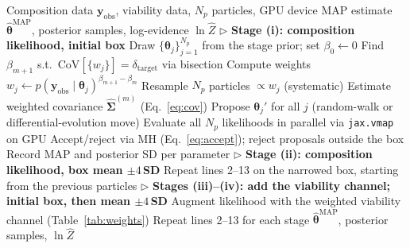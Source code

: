 \documentclass[11pt,a4paper]{article}
\newcommand{\btheta}{\boldsymbol{\theta}}
\newcommand{\yobs}{\mathbf{y}_{\mathrm{obs}}}
\begin{document}
\begin{algorithm}[t]
\caption{Staged GPU-accelerated TMCMC (one seed; every stage is run with three seeds and checked as in Section~\ref{sec:convergence})}
\label{alg:tmcmc}
\begin{algorithmic}[1]
\REQUIRE Composition data $\yobs$, viability data, $N_p$ particles, GPU device
\ENSURE MAP estimate $\hat{\btheta}^{\mathrm{MAP}}$, posterior samples, log-evidence $\ln\hat{Z}$
\STATE $\triangleright$ \textbf{Stage (i): composition likelihood, initial box}
\STATE Draw $\{\btheta_j\}_{j=1}^{N_p}$ from the stage prior; set $\beta_0\leftarrow 0$
    \STATE Find $\beta_{m+1}$ s.t.\ $\mathrm{CoV}[\{w_j\}]=\delta_{\mathrm{target}}$ via bisection
    \STATE Compute weights $w_j \leftarrow p(\yobs\mid\btheta_j)^{\beta_{m+1}-\beta_m}$
    \STATE Resample $N_p$ particles $\propto w_j$ (systematic)
    \STATE Estimate weighted covariance $\hat{\boldsymbol{\Sigma}}^{(m)}$ (Eq.~\ref{eq:cov})
        \STATE Propose $\btheta_{j}'$ for all $j$ (random-walk or differential-evolution move)
        \STATE Evaluate all $N_p$ likelihoods in parallel via \texttt{jax.vmap} on GPU
        \STATE Accept/reject via MH (Eq.~\ref{eq:accept}); reject proposals outside the box
    \ENDFOR
\ENDWHILE
\STATE Record MAP and posterior SD per parameter
\STATE $\triangleright$ \textbf{Stage (ii): composition likelihood, box mean $\pm4$\,SD}
\STATE Repeat lines 2--13 on the narrowed box, starting from the previous particles
\STATE $\triangleright$ \textbf{Stages (iii)--(iv): add the viability channel; initial box, then mean $\pm4$\,SD}
\STATE Augment likelihood with the weighted viability channel (Table~\ref{tab:weights})
\STATE Repeat lines 2--13 for each stage
\RETURN $\hat{\btheta}^{\mathrm{MAP}}$, posterior samples, $\ln\hat{Z}$
\end{algorithmic}
\end{algorithm}
\end{document}
